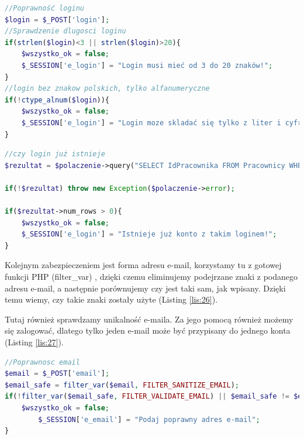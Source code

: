 \documentclass[eng,printmode,openany,oneside]{mgr}
\begin{document}
	

\begin{lstlisting}[caption={Implementacja sprawdzenia poprawności loginu}, language=PHP, label={lis:24}]
//Poprawność loginu
$login = $_POST['login'];
//Sprawdzenie dlugosci loginu
if(strlen($login)<3 || strlen($login)>20){
	$wszystko_ok = false;
	$_SESSION['e_login'] = "Login musi mieć od 3 do 20 znaków!";
}
//login bez znakow polskich, tylko alfanumeryczne
if(!ctype_alnum($login)){
	$wszystko_ok = false;
	$_SESSION['e_login'] = "Login moze skladać się tylko z liter i cyfr, bez polskich znaków!";
}
\end{lstlisting}
		

	
\begin{lstlisting}[caption={Implementacja sprawdzenia czy login istnieje w bazie danych}, language=PHP, label={lis:25}]
//czy login już istnieje
$rezultat = $polaczenie->query("SELECT IdPracownika FROM Pracownicy WHERE Login='$login'");

if(!$rezultat) throw new Exception($polaczenie->error);

if($rezultat->num_rows > 0){
	$wszystko_ok = false;
	$_SESSION['e_login'] = "Istnieje już konto z takim loginem!";
}
\end{lstlisting}
	

	
	







	
Kolejnym zabezpieczeniem jest forma adresu e-mail, korzystamy tu z gotowej funkcji PHP (filter\_var) , dzięki czemu eliminujemy podejrzane znaki z podanego adresu e-mail, a następnie porównujemy czy jest taki sam, jak wpisany. Dzięki temu wiemy, czy takie znaki zostały użyte (Listing \ref{lis:26}).

Tutaj również sprawdzamy unikalność e-maila. Za jego pomocą również możemy się zalogować, dlatego tylko jeden e-mail może być przypisany do jednego konta (Listing \ref{lis:27}).


	
	
\begin{lstlisting}[caption={Implementacja sprawdzenia poprawności e-maila}, language=PHP, label={lis:26}]
//Poprawnosc email
$email = $_POST['email'];
$email_safe = filter_var($email, FILTER_SANITIZE_EMAIL);
if(!filter_var($email_safe, FILTER_VALIDATE_EMAIL) || $email_safe != $email){
	$wszystko_ok = false;
      	$_SESSION['e_email'] = "Podaj poprawny adres e-mail";
}
\end{lstlisting}
	
\end{document}
